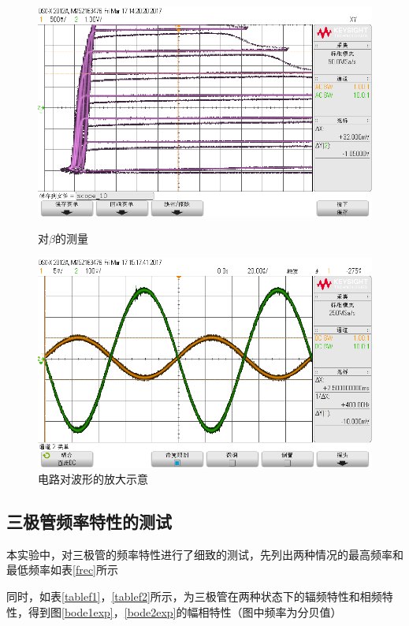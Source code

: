 \documentclass[UTF8,a4paper]{ctexart}
\begin{document}
\begin{figure}
\centering
\includegraphics[width=\textwidth]{scope_10.png}
\caption{对$\beta$的测量}
\label{testBJT}
\includegraphics[width=\textwidth]{scope_14.png}
\caption{电路对波形的放大示意}
\label{exppic}
\end{figure}
\subsection{三极管频率特性的测试}
本实验中，对三极管的频率特性进行了细致的测试，先列出两种情况的最高频率和最低频率如表\ref{frec}所示

同时，如表\ref{tablef1}，\ref{tablef2}所示，为三极管在两种状态下的辐频特性和相频特性，得到图\ref{bode1exp}，\ref{bode2exp}的幅相特性（图中频率为分贝值）
\end{document}
